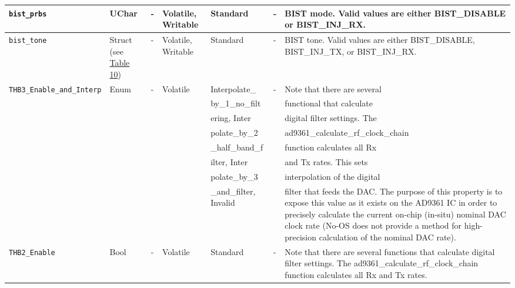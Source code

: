 \documentclass{article}
\begin{document}
\begin{landscape}
\begin{scriptsize}
\begin{longtable}{|p{3.6cm}|p{8.1cm}|p{1.4cm}|p{1.3cm}|p{1.4cm}|p{2.5cm}|p{3.6cm}|}
			\hline
			\verb+bist_prbs+ & UChar & - & Volatile, Writable & Standard & - & BIST mode. Valid values are either BIST\_DISABLE or BIST\_INJ\_RX. \\
			\hline
			\verb+bist_tone+ & Struct (see \hyperlink{tab10}{Table 10}) & - & Volatile, Writable & Standard & - & BIST tone. Valid values are either BIST\_DISABLE, BIST\_INJ\_TX, or BIST\_INJ\_RX. \\
			\hline
			\verb+THB3_Enable_and_Interp+ & Enum & - & Volatile & Interpolate\_ & - &  Note that there are several \\
			                              &      &   &          & by\_1\_no\_filt        &   & functional that calculate \\
			                              &      &   &          & ering, Inter           &   & digital filter settings. The \\
			                              &      &   &          & polate\_by\_2          &   &  ad9361\_calculate\_rf\_clock\_chain \\
			                              &      &   &          & \_half\_band\_f        &   &  function calculates all Rx \\
			                              &      &   &          & ilter, Inter           &   &  and Tx rates. This sets \\
			                              &      &   &          & polate\_by\_3          &   &  interpolation of the digital\\
			                              &      &   &          & \_and\_filter, Invalid &   &  filter that feeds the
                                            DAC. The purpose of this property is
                                            to expose this value as it exists on
                                            the AD9361 IC in order to precisely
                                            calculate the current on-chip
                                            (in-situ) nominal DAC clock rate
                                            (No-OS does not provide a method for
                                            high-precision calculation of the
                                            nominal DAC rate). \\
			\hline
			\verb+THB2_Enable+ & Bool & - & Volatile & Standard & - &
                               Note that there are several
                                 functions that calculate digital filter
                                 settings. The ad9361\_calculate\_rf\_clock\_chain
                                 function calculates all Rx and Tx rates.

\end{longtable}
\end{scriptsize}
\end{landscape}
\end{document}
